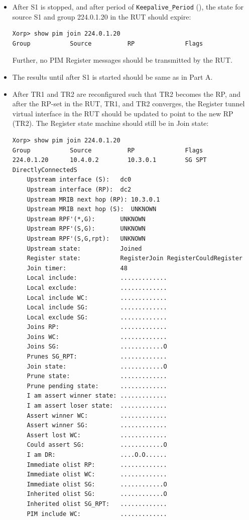\documentclass[11pt]{report}
\begin{document}
\begin{itemize}
  \item After S1 is stopped, and after period of \verb=Keepalive_Period=
  ({\PimsmKeepalivePeriod}), the state for source S1 and group 224.0.1.20
  in the RUT should expire:

\begin{verbatim}
Xorp> show pim join 224.0.1.20
Group           Source          RP              Flags
\end{verbatim}

  Further, no PIM Register messages should be transmitted by the RUT.

\end{itemize}


\begin{itemize}

  \item The results until after S1 is started should be same as in Part A.

  \item After TR1 and TR2 are reconfigured such that TR2 becomes the RP,
  and after the RP-set in the RUT, TR1, and TR2 converges, the Register tunnel
  virtual interface in the RUT should be updated to point to the new RP (TR2).
  The Register state machine should still be in Join state:

\begin{verbatim}
Xorp> show pim join 224.0.1.20
Group           Source          RP              Flags
224.0.1.20      10.4.0.2        10.3.0.1        SG SPT DirectlyConnectedS 
    Upstream interface (S):   dc0
    Upstream interface (RP):  dc2
    Upstream MRIB next hop (RP): 10.3.0.1
    Upstream MRIB next hop (S):  UNKNOWN
    Upstream RPF'(*,G):       UNKNOWN
    Upstream RPF'(S,G):       UNKNOWN
    Upstream RPF'(S,G,rpt):   UNKNOWN
    Upstream state:           Joined 
    Register state:           RegisterJoin RegisterCouldRegister 
    Join timer:               48
    Local include:            .............
    Local exclude:            .............
    Local include WC:         .............
    Local include SG:         .............
    Local exclude SG:         .............
    Joins RP:                 .............
    Joins WC:                 .............
    Joins SG:                 ............O
    Prunes SG_RPT:            .............
    Join state:               ............O
    Prune state:              .............
    Prune pending state:      .............
    I am assert winner state: .............
    I am assert loser state:  .............
    Assert winner WC:         .............
    Assert winner SG:         .............
    Assert lost WC:           .............
    Could assert SG:          ............O
    I am DR:                  ....O.O......
    Immediate olist RP:       .............
    Immediate olist WC:       .............
    Immediate olist SG:       ............O
    Inherited olist SG:       ............O
    Inherited olist SG_RPT:   .............
    PIM include WC:           .............
\end{verbatim}


\end{itemize}
\end{document}
